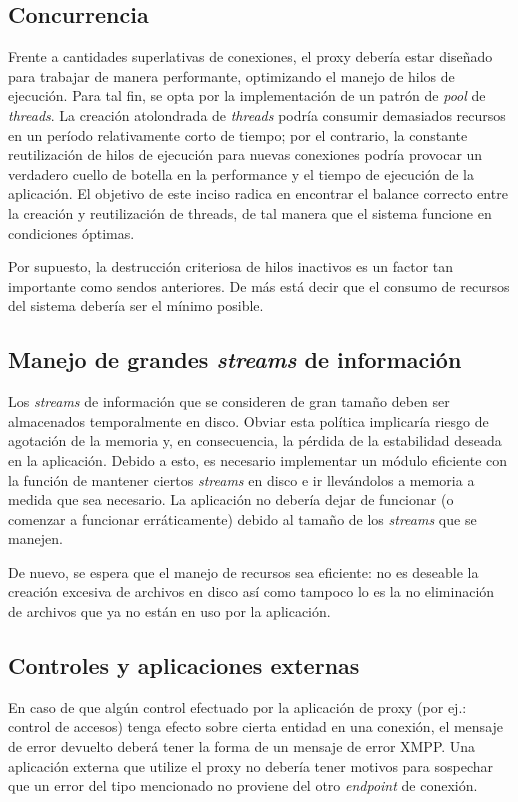 \documentclass[a4paper,10pt]{article}
\begin{document}
\subsection{Concurrencia}
Frente a cantidades superlativas de conexiones, el proxy debería estar diseñado para trabajar de manera performante, optimizando el manejo de hilos de ejecución.
Para tal fin, se opta por la implementación de un patrón de \textit{pool} de \textit{threads}. La creación atolondrada de \textit{threads} podría consumir demasiados recursos
en un período relativamente corto de tiempo; por el contrario, la constante reutilización de hilos de ejecución para nuevas conexiones podría provocar un verdadero
cuello de botella en la performance y el tiempo de ejecución de la aplicación. El objetivo de este inciso radica en encontrar el balance correcto entre la creación y reutilización de threads,
de tal manera que el sistema funcione en condiciones óptimas.

Por supuesto, la destrucción criteriosa de hilos inactivos es un factor tan importante como sendos anteriores. De más está decir que el consumo de recursos del sistema debería
ser el mínimo posible.

\subsection{Manejo de grandes \textit{streams} de información}
Los \textit{streams} de información que se consideren de gran tamaño deben ser almacenados temporalmente en disco. Obviar esta política implicaría riesgo de agotación de la memoria y, en consecuencia,
la pérdida de la estabilidad deseada en la aplicación. Debido a esto, es necesario implementar un módulo eficiente con la función de mantener ciertos \textit{streams}
en disco e ir llevándolos a memoria a medida que sea necesario. La aplicación no debería dejar de funcionar (o comenzar a funcionar erráticamente) debido al tamaño de los
\textit{streams} que se manejen.

De nuevo, se espera que el manejo de recursos sea eficiente: no es deseable la creación excesiva de archivos en disco así como tampoco lo es la no eliminación de archivos que ya no están en uso
por la aplicación.

\subsection{Controles y aplicaciones externas}
En caso de que algún control efectuado por la aplicación de proxy (por ej.: control de accesos) tenga efecto sobre cierta entidad en una conexión, el mensaje de error devuelto deberá tener
la forma de un mensaje de error XMPP. Una aplicación externa que utilize el proxy no debería tener motivos para sospechar que un error del tipo mencionado no proviene del otro
\textit{endpoint} de conexión.
\end{document}

